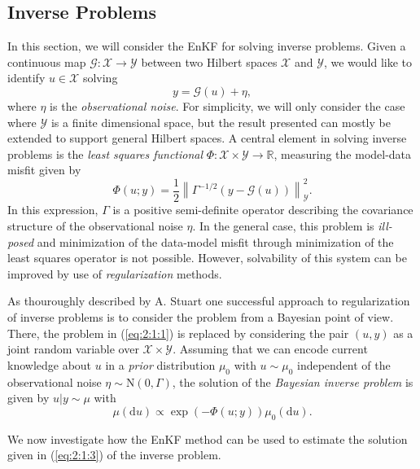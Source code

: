 \documentclass[a4paper,5p]{elsarticle}
\newcommand{\norm}[1]{\left\lVert#1\right\rVert}
\begin{document}
\subsection{Inverse Problems} \label{subsec:2:1}
In this section, we will consider the EnKF for solving inverse problems. Given a continuous
map $\mathcal{G} : \mathcal{X} \rightarrow \mathcal{Y}$ between two Hilbert spaces $\mathcal{X}$
and $\mathcal{Y}$, we would like to identify $u \in \mathcal{X}$ solving 
\begin{equation} \label{eq:2:1:1}
    y = \mathcal{G}(u) + \eta,
\end{equation}
where $\eta$ is the \textit{observational noise}. For simplicity, we will only consider the case where $\mathcal{Y}$
is a finite dimensional space, but the result presented can mostly be extended to support general Hilbert spaces.
A central element in solving inverse problems is the \textit{least squares functional} $\Phi : \mathcal{X} \times \mathcal{Y} \rightarrow \mathbb{R}$, measuring
the model-data misfit
given by
\begin{equation} \label{eq:2:1:2}
    \Phi(u; y) = \frac12\norm{\Gamma^{-1/2}\left(y - \mathcal{G}(u)\right)}_\mathcal{Y}^2.
\end{equation}
In this expression, $\Gamma$ is a positive semi-definite operator describing the covariance
structure of the observational noise $\eta$. In the general case, this problem is \textit{ill-posed}
and minimization of the data-model misfit through minimization of the least squares operator is not
possible. However, solvability of this system can be improved by use of \textit{regularization} methods.

As thouroughly described by A. Stuart \cite{stuart2010inverse} one successful approach to regularization of inverse problems
is to consider the problem from a Bayesian point of view. There, the problem in (\ref{eq:2:1:1}) is replaced
by considering the pair $(u, y)$ as a joint random variable over $\mathcal{X} \times \mathcal{Y}$. Assuming
that we can encode current knowledge about $u$ in a \textit{prior} distribution $\mu_0$ with $u \sim \mu_0$
independent of the observational noise $\eta \sim \text{N}(0, \Gamma)$, the solution of the
\textit{Bayesian inverse problem} is given by $u|y \sim \mu$ with
\begin{equation} \label{eq:2:1:3}
    \mu(\text{d}u) \propto \exp\left(-\Phi(u; y)\right)\mu_0(\text{d}u).
\end{equation}

We now investigate how the EnKF method can be used to estimate the solution given in (\ref{eq:2:1:3}) of the 
inverse problem.
\end{document}
